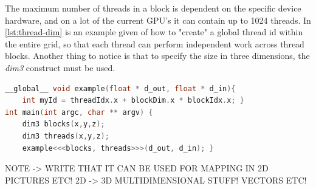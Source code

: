 The maximum number of threads in a block is dependent on the specific device hardware, and on a lot of the current GPU's it can contain up to 1024 threads\cite{cuda:programmingguide}.
In \autoref{lst:thread-dim} is an example given of how to "create" a global thread id within the entire grid, so that each thread can perform independent work across thread blocks.
Another thing to notice is that to specify the size in three dimensions, the \textit{dim3} construct must be used.
\begin{lstlisting}[language=C,caption={Example of thread id usage in a grid of multiple thread blocks},label=lst:thread-dim]
__global__ void example(float * d_out, float * d_in){
	int myId = threadIdx.x + blockDim.x * blockIdx.x; }
int main(int argc, char ** argv) {
	dim3 blocks(x,y,z);
	dim3 threads(x,y,z);
	example<<<blocks, threads>>>(d_out, d_in); }
\end{lstlisting}


NOTE -> WRITE THAT IT CAN BE USED FOR MAPPING IN 2D PICTURES ETC!
2D -> 3D
MULTIDIMENSIONAL STUFF! VECTORS ETC!



